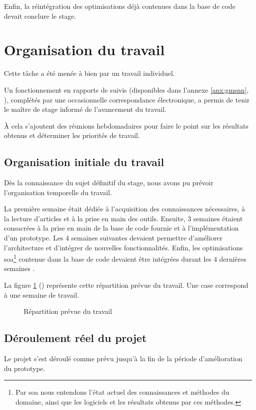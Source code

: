 Enfin, la réintégration des optimisations déjà contenues dans la base de code devait conclure le stage.

\section{Organisation du travail}
Cette tâche a été menée à bien par un travail individuel.

Un fonctionnement en rapports de suivis (disponibles dans l'annexe \ref{anx:gmsnn}, ), complétés par une occasionnelle correspondance électronique, a permis de tenir le maître de stage informé de l'avancement du travail.

À cela s'ajoutent des réunions hebdomadaires pour faire le point sur les résultats obtenus et déterminer les priorités de travail.

\subsection{Organisation initiale du travail}
Dès la connaissance du sujet définitif du stage, 
nous avons pu prévoir l'organisation temporelle du travail.

La première semaine était dédiée à l'acquisition des connaissances nécessaires, à la lecture d'articles et à la prise en main des outils.
Ensuite, 3 semaines étaient consacrées à la prise en main de la base de code fournie et à l'implémentation d'un prototype.
Les 4 semaines suivantes devaient permettre d'améliorer l'architecture et d'intégrer de nouvelles fonctionnalités.
Enfin, les optimisations \gls{soa}\footnote{Par \gls{soa} nous entendons l'état actuel des connaissances et méthodes du domaine, ainsi que les logiciels et les résultats obtenus par ces méthodes.} contenue dans la base de code devaient être intégrées durant les 4 dernières semaines .

La figure \ref{fig:gmsnn_time_1} () représente cette répartition prévue du travail.
Une case correspond à une semaine de travail.
\begin{figure}[ht]
	\centering
	\caption[Répartition prévue du travail]{Répartition prévue du travail}\label{fig:gmsnn_time_1}
\end{figure}

\subsection{Déroulement réel du projet}
Le projet s'est déroulé comme prévu jusqu'à la fin de la période d'amélioration du prototype.

